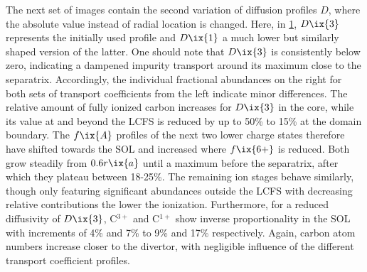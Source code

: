 %
                \begin{figure}[t]%
                    \centering%
                    \begin{minipage}[b]{0.48\textwidth}%
                        \centering%
                    \end{minipage}%
                    \hfill%
                    \begin{minipage}[b]{0.48\textwidth}%
                        \centering%
                    \end{minipage}%
                    \label{fig:transp_abund_103_104}%
                \end{figure}%
%
                The next set of images contain the second variation of diffusion profiles $D$, where the absolute value instead of radial location is changed. Here, in \cref{fig:transp_abund_103_104}, $D\ix{3}$ represents the initially used profile and $D\ix{1}$ a much lower but similarly shaped version of the latter. One should note that $D\ix{3}$ is consistently below zero, indicating a dampened impurity transport around its maximum close to the separatrix. Accordingly, the individual fractional abundances on the right for both sets of transport coefficients from the left indicate minor differences. The relative amount of fully ionized carbon increases for $D\ix{3}$ in the core, while its value at and beyond the LCFS is reduced by up to 50\% to 15\% at the domain boundary. The $f\ix{A}$ profiles of the next two lower charge states therefore have shifted towards the SOL and increased where $f\ix{6+}$ is reduced. Both grow steadily from $0.6r\ix{a}$ until a maximum before the separatrix, after which they plateau between 18-25\%. The remaining ion stages behave similarly, though only featuring significant abundances outside the LCFS with decreasing relative contributions the lower the ionization. Furthermore, for a reduced diffusivity of $D\ix{3}$, C$^{3+}$ and C$^{1+}$ show inverse proportionality in the SOL with increments of 4\% and 7\% to 9\% and 17\% respectively. Again, carbon atom numbers increase closer to the divertor, with negligible influence of the different transport coefficient profiles.\\%
